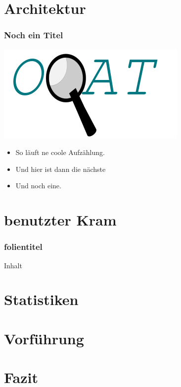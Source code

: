 \documentclass[t]{beamer}
\begin{document}
\section{Architektur}
\begin{frame}
	\frametitle{Noch ein Titel}
	\begin{minipage}{5.5cm}
		\includegraphics[scale=.29]{img/oqatLogo}	
	\end{minipage}
	\begin{minipage}{5.5cm}
		\begin{itemize}
		\item <+-> So läuft ne coole Aufzählung.
		\item <+-> Und hier ist dann die nächste
		\item <+-> Und noch eine.
		\end{itemize}
	\end{minipage}
\end{frame}
\section{benutzter Kram}
\begin{frame}
\frametitle{folientitel}
Inhalt
\end{frame}
\section{Statistiken}
\section{Vorführung}
\section{Fazit}
\end{document}
